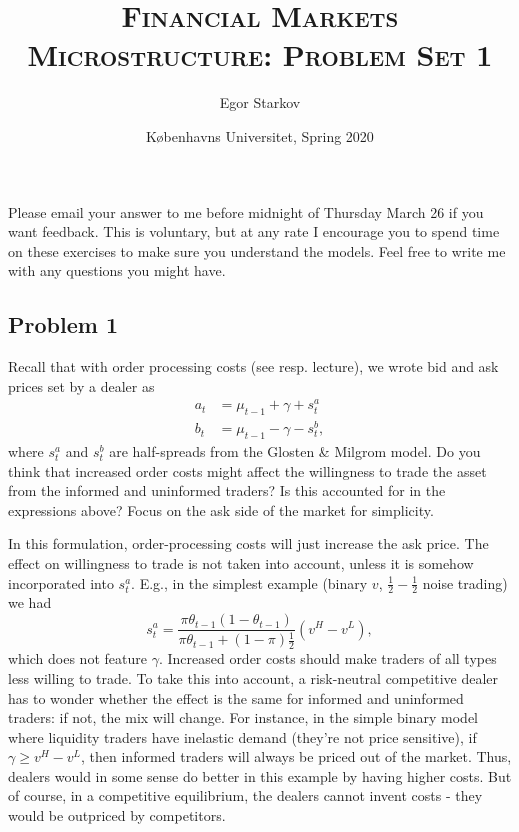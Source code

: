 \documentclass[11pt
, answers
]{exam}
\begin{document}
\title{\textsc{Financial Markets Microstructure: Problem Set 1}}
\date{K{\o}benhavns Universitet, Spring 2020}
\author{Egor Starkov}


\maketitle


Please email your answer to me before midnight of Thursday March 26 if you want feedback. This is voluntary, but at any rate I encourage you to spend time on these exercises to make sure you understand the models. Feel free to write me with any questions you might have.



\subsection*{Problem 1}

Recall that with order processing costs (see resp. lecture), we wrote bid and ask prices set by a dealer as
\begin{align*}
	a_t &= \mu_{t-1} + \gamma + s^a_t
	\\
	b_t &= \mu_{t-1} - \gamma - s^b_t,
\end{align*}
where $s^a_t$ and $s^b_t$ are half-spreads from the Glosten \& Milgrom model. Do you think that increased order costs might affect the willingness to trade the asset from the informed and uninformed traders? Is this accounted for in the expressions above? Focus on the ask side of the market for simplicity.


\begin{solution}
	In this formulation, order-processing costs will just increase the ask price. The effect on willingness to trade is not taken into account, unless it is somehow incorporated into $s^a_t$. E.g., in the simplest example (binary $v$, $\frac{1}{2}-\frac{1}{2}$ noise trading) we had
	\[
	s^a_t = \frac{\pi \theta_{t-1}(1-\theta_{t-1})}{\pi\theta_{t-1}+(1-\pi)\frac{1}{2}}(v^H-v^L),
	\] 
	which does not feature $\gamma$.
	Increased order costs should make traders of all types less willing to trade. To take this into account, a risk-neutral competitive dealer has to wonder whether the effect is the same for informed and uninformed traders: if not, the mix will change. For instance, in the simple binary model where liquidity traders have inelastic demand (they're not price sensitive), if $\gamma \geq v^H-v^L$, then informed traders will always be priced out of the market. Thus, dealers would in some sense do better in this example by having higher costs. But of course, in a competitive equilibrium, the dealers cannot invent costs - they would be outpriced by competitors.
\end{solution}
\end{document}

